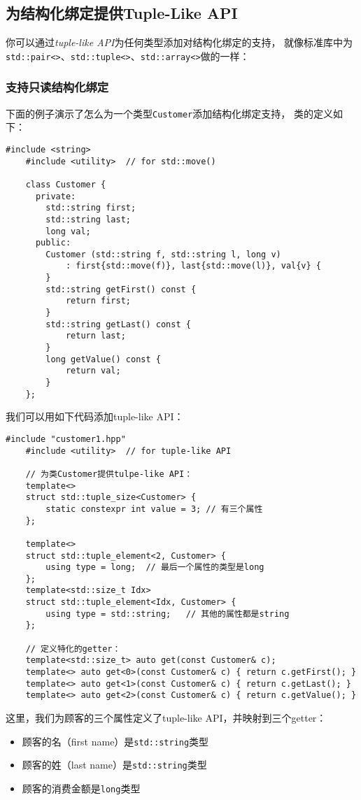 \subsection{为结构化绑定提供Tuple-Like API}
你可以通过\emph{tuple-like API}为任何类型添加对结构化绑定的支持，
就像标准库中为\texttt{std::pair<>}、\texttt{std::tuple<>}、\texttt{std::array<>}做的一样：

\subsubsection*{支持只读结构化绑定}
下面的例子演示了怎么为一个类型\texttt{Customer}添加结构化绑定支持，
类的定义如下：
\begin{lstlisting}[frame=single, title=lang/customer1.hpp]
    #include <string>
    #include <utility>  // for std::move()

    class Customer {
      private:
        std::string first;
        std::string last;
        long val;
      public:
        Customer (std::string f, std::string l, long v)
            : first{std::move(f)}, last{std::move(l)}, val{v} {
        }
        std::string getFirst() const {
            return first;
        }
        std::string getLast() const {
            return last;
        }
        long getValue() const {
            return val;
        }
    };
\end{lstlisting}
我们可以用如下代码添加tuple-like API：
\begin{lstlisting}[frame=single, title=lang/structbind1.hpp]
    #include "customer1.hpp"
    #include <utility>  // for tuple-like API

    // 为类Customer提供tulpe-like API：
    template<>
    struct std::tuple_size<Customer> {
        static constexpr int value = 3; // 有三个属性
    };

    template<>
    struct std::tuple_element<2, Customer> {
        using type = long;  // 最后一个属性的类型是long
    };
    template<std::size_t Idx>
    struct std::tuple_element<Idx, Customer> {
        using type = std::string;   // 其他的属性都是string
    };

    // 定义特化的getter：
    template<std::size_t> auto get(const Customer& c);
    template<> auto get<0>(const Customer& c) { return c.getFirst(); }
    template<> auto get<1>(const Customer& c) { return c.getLast(); }
    template<> auto get<2>(const Customer& c) { return c.getValue(); }
\end{lstlisting}
这里，我们为顾客的三个属性定义了tuple-like API，并映射到三个getter：
\begin{itemize}[leftmargin=*]
    \item 顾客的名（first name）是\texttt{std::string}类型
    \item 顾客的姓（last name）是\texttt{std::string}类型
    \item 顾客的消费金额是\texttt{long}类型
\end{itemize}
